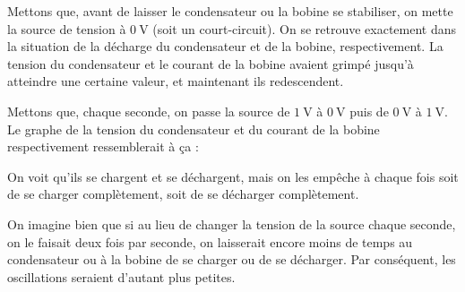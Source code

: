 \documentclass{article}
\begin{document}
Mettons que, avant de laisser le condensateur ou la bobine se stabiliser, on mette la source de tension à $\SI{0}{\volt}$ (soit un court-circuit). On se retrouve exactement dans la situation de la décharge du condensateur et de la bobine, respectivement. La tension du condensateur et le courant de la bobine avaient grimpé jusqu'à atteindre une certaine valeur, et maintenant ils redescendent.

Mettons que, chaque seconde, on passe la source de $\SI{1}{\volt}$ à $\SI{0}{\volt}$ puis de $\SI{0}{\volt}$ à $\SI{1}{\volt}$. Le graphe de la tension du condensateur et du courant de la bobine respectivement ressemblerait à ça :

\begin{center}
\end{center}

On voit qu'ils se chargent et se déchargent, mais on les empêche à chaque fois soit de se charger complètement, soit de se décharger complètement.

On imagine bien que si au lieu de changer la tension de la source chaque seconde, on le faisait deux fois par seconde, on laisserait encore moins de temps au condensateur ou à la bobine de se charger ou de se décharger. Par conséquent, les oscillations seraient d'autant plus petites.
\end{document}
